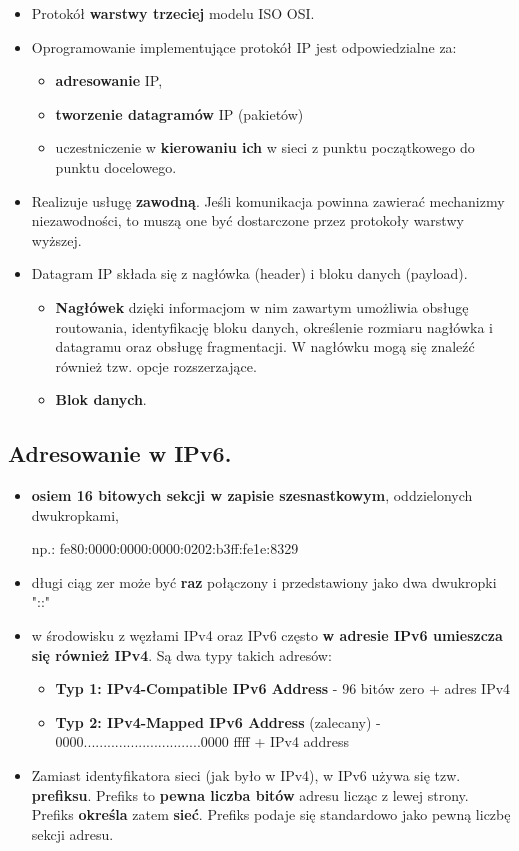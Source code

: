 \documentclass[12pt]{article}
\begin{document}
    \begin{itemize}
        \item Protokół \textbf{warstwy trzeciej} modelu ISO OSI.
        \item Oprogramowanie implementujące protokół IP jest odpowiedzialne za:
        \begin{itemize}
            \item \textbf{adresowanie} IP,
            \item \textbf{tworzenie datagramów} IP (pakietów)
            \item uczestniczenie w \textbf{kierowaniu ich} w sieci z punktu początkowego do punktu docelowego.
        \end{itemize}
        \item Realizuje usługę \textbf{zawodną}. Jeśli komunikacja powinna zawierać mechanizmy niezawodności, to muszą one być dostarczone przez protokoły warstwy wyższej.
        \item Datagram IP składa się z nagłówka (header) i bloku danych (payload).
        \begin{itemize}
            \item \textbf{Nagłówek} dzięki informacjom w nim zawartym umożliwia obsługę routowania, identyfikację bloku danych, określenie rozmiaru nagłówka i datagramu oraz obsługę fragmentacji. W nagłówku mogą się znaleźć również tzw. opcje rozszerzające.
            \item \textbf{Blok danych}.
        \end{itemize}
    \end{itemize}

    \subsection{Adresowanie w IPv6.}

    \begin{itemize}
        \item \textbf{osiem 16 bitowych sekcji w zapisie szesnastkowym}, oddzielonych dwukropkami,

        np.: fe80:0000:0000:0000:0202:b3ff:fe1e:8329
        \item długi ciąg zer może być \textbf{raz} połączony i przedstawiony jako dwa dwukropki "::"
        \item w środowisku z węzłami IPv4 oraz IPv6 często \textbf{w adresie IPv6 umieszcza się również IPv4}. Są dwa typy takich adresów:
        \begin{itemize}
            \item \textbf{Typ 1: IPv4-Compatible IPv6 Address} - 96 bitów zero + adres IPv4
            \item \textbf{Typ 2: IPv4-Mapped IPv6 Address} (zalecany) - $0000..............................0000$ ffff + IPv4 address
        \end{itemize}
        \item Zamiast identyfikatora sieci (jak było w IPv4), w IPv6 używa się tzw. \textbf{prefiksu}. Prefiks to \textbf{pewna liczba bitów} adresu licząc z lewej strony. Prefiks \textbf{określa} zatem \textbf{sieć}. Prefiks podaje się standardowo jako pewną liczbę sekcji adresu.
    \end{itemize}
\end{document}
